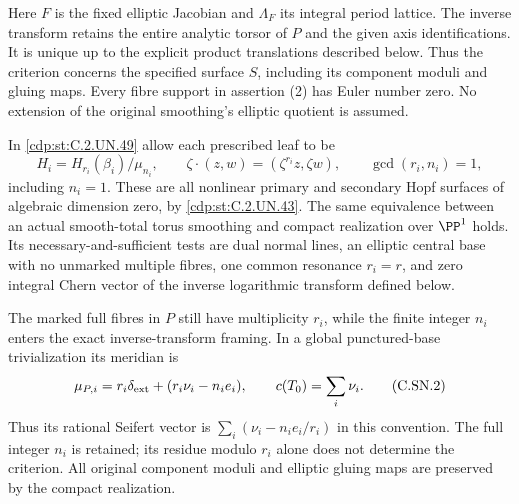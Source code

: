 \begin{proposition}
Here $F$ is the fixed elliptic Jacobian and $\Lambda_F$ its
integral period lattice. The inverse transform retains
the entire analytic torsor of $P$ and the given axis
identifications. It is unique up to the explicit product
translations described below. Thus the criterion concerns
the specified surface $S$, including its component
moduli and gluing maps. Every fibre support in assertion
(2) has Euler number zero. No extension of the original
smoothing's elliptic quotient is assumed.
\end{proposition}

\begin{proposition}\label{cdp:st:C.2.UN.50}

In \ref{cdp:st:C.2.UN.49} allow each prescribed leaf to be
\[
 H_i=H_{r_i}(\beta_i)/\mu_{n_i},\qquad
 \zeta\cdot(z,w)=(\zeta^{r_i}z,\zeta w),\qquad
                         \gcd(r_i,n_i)=1,               \tag{C.SN.1}\label{cdp:eq:C.SN.1}
\]
including $n_i=1$. These are all nonlinear primary and
secondary Hopf surfaces of algebraic dimension zero,
by \ref{cdp:st:C.2.UN.43}. The same equivalence between an actual
smooth-total torus smoothing and compact realization
over $\PP^1$ holds. Its necessary-and-sufficient tests
are dual normal lines, an elliptic central base with
no unmarked multiple fibres, one common resonance
$r_i=r$, and zero integral Chern vector of the
inverse logarithmic transform defined below.

The marked full fibres in $P$ still have multiplicity
$r_i$, while the finite integer $n_i$ enters the
exact inverse-transform framing. In a global
punctured-base trivialization its meridian is
\[
       \mu_{P,i}=r_i\delta_{\rm ext}
                         +(r_i\nu_i-n_i e_i),\qquad
                         c(T_0)=\sum_i\nu_i.             \tag{C.SN.2}\label{cdp:eq:C.SN.2}
\]
Thus its rational Seifert vector is
$\sum_i(\nu_i-n_i e_i/r_i)$ in this convention.
The full integer $n_i$ is retained; its residue
modulo $r_i$ alone does not determine the criterion.
All original component moduli and elliptic gluing
maps are preserved by the compact realization.
\end{proposition}

